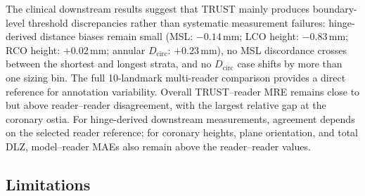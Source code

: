 \documentclass[conference]{IEEEtran}
\begin{document}
{\color{red} The clinical downstream results suggest that TRUST mainly produces boundary-level threshold discrepancies rather than systematic measurement failures: hinge-derived distance biases remain small (MSL: $-0.14$\,mm; LCO height: $-0.83$\,mm; RCO height: $+0.02$\,mm; annular $D_{\text{circ}}$: $+0.23$\,mm), no MSL discordance crosses between the shortest and longest strata, and no $D_{\text{circ}}$ case shifts by more than one sizing bin. The full 10-landmark multi-reader comparison provides a direct reference for annotation variability. Overall TRUST--reader MRE remains close to but above reader--reader disagreement, with the largest relative gap at the coronary ostia. For hinge-derived downstream measurements, agreement depends on the selected reader reference; for coronary heights, plane orientation, and total DLZ, model--reader MAEs also remain above the reader--reader values.}

\subsection{Limitations}
\end{document}

